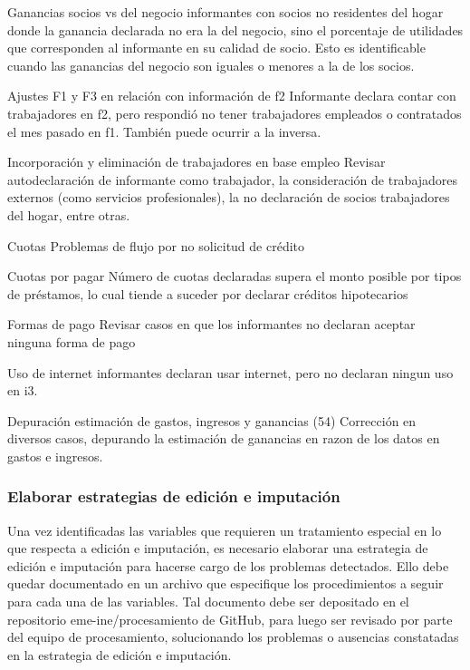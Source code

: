 \documentclass[
]{article}
\begin{document}
Ganancias socios vs del negocio informantes con socios no residentes del hogar donde la ganancia declarada no era la del negocio, sino el porcentaje de utilidades que corresponden al informante en su calidad de socio. Esto es identificable cuando las ganancias del negocio son iguales o menores a la de los socios.

Ajustes F1 y F3 en relación con información de f2 Informante declara contar con trabajadores en f2, pero respondió no tener trabajadores empleados o contratados el mes pasado en f1. También puede ocurrir a la inversa.

Incorporación y eliminación de trabajadores en base empleo Revisar autodeclaración de informante como trabajador, la consideración de trabajadores externos (como servicios profesionales), la no declaración de socios trabajadores del hogar, entre otras.

Cuotas Problemas de flujo por no solicitud de crédito

Cuotas por pagar Número de cuotas declaradas supera el monto posible por tipos de préstamos, lo cual tiende a suceder por declarar créditos hipotecarios

Formas de pago Revisar casos en que los informantes no declaran aceptar ninguna forma de pago

Uso de internet informantes declaran usar internet, pero no declaran ningun uso en i3.

Depuración estimación de gastos, ingresos y ganancias (54) Corrección en diversos casos, depurando la estimación de ganancias en razon de los datos en gastos e ingresos.

\hypertarget{elaborar-estrategias-de-ediciuxf3n-e-imputaciuxf3n}{%
\subsubsection{Elaborar estrategias de edición e imputación}\label{elaborar-estrategias-de-ediciuxf3n-e-imputaciuxf3n}}

Una vez identificadas las variables que requieren un tratamiento especial en lo que respecta a edición e imputación, es necesario elaborar una estrategia de edición e imputación para hacerse cargo de los problemas detectados. Ello debe quedar documentado en un archivo que especifique los procedimientos a seguir para cada una de las variables. Tal documento debe ser depositado en el repositorio eme-ine/procesamiento de GitHub, para luego ser revisado por parte del equipo de procesamiento, solucionando los problemas o ausencias constatadas en la estrategia de edición e imputación.
\end{document}
